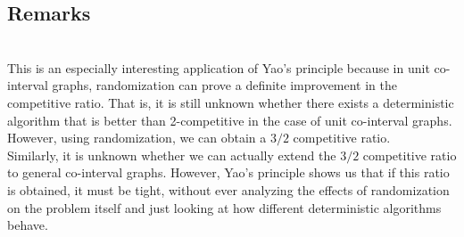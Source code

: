 \documentclass{article}
\begin{document}
\subsection{Remarks}
\\This is an especially interesting application of Yao's principle because in unit co-interval graphs, randomization can prove a definite improvement in the competitive ratio. That is, it is still unknown whether there exists a deterministic algorithm that is better than 2-competitive in the case of unit co-interval graphs. However, using randomization, we can obtain a $3/2$ competitive ratio.
\\Similarly, it is unknown whether we can actually extend the $3/2$ competitive ratio to general co-interval graphs. However, Yao's principle shows us that if this ratio is obtained, it must be tight, without ever analyzing the effects of randomization on the problem itself and just looking at how different deterministic algorithms behave.
\end{document}
